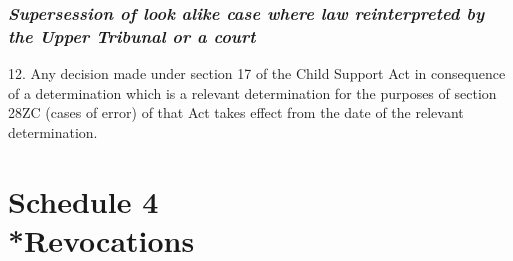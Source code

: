 \documentclass[12pt,a4paper]{article}
\begin{document}

\section*{\itshape\sloppy{} Supersession of look alike case where law reinterpreted by the Upper Tribunal or a court}

12.  Any decision made under section 17 of the Child Support Act in consequence of a determination which is a relevant determination for the purposes of section 28ZC (cases of error) of that Act takes effect from the date of the relevant determination.

\part[Schedule 4 --- Revocations]{Schedule 4\\*Revocations}

\renewcommand\parthead{--- Schedule 4}
\end{document}
